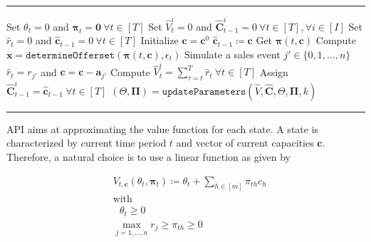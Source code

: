 \begin{minipage}{\linewidth}
	\vspace*{0.5cm}
	\hrule
	\begin{algorithmic}[1]
		\State Set $\theta_t = 0$ and $\boldsymbol{\pi}_t = \boldsymbol{0} ~\forall t \in [T]$ \label{alg-API1}
		 \label{alg-API-Piter1}
		\State Set $\hat{V}_t^i = 0$ and $\boldsymbol{\hat{C}}_{t-1}^i = 0 ~\forall t \in [T], \forall i \in [I] $ \label{alg-API3}
		\label{alg-API-Peval1}
		\State Set $\hat{r}_t = 0$ and $\boldsymbol{\hat{c}}_{t-1} = 0 ~\forall t \in [T]$ \label{alg-API5}
		\State Initialize $\boldsymbol{c} = \boldsymbol{c}^0$\label{alg-API6}
		\State $\boldsymbol{\hat{c}}_{t-1} \coloneqq \boldsymbol{c}$\label{alg-API8}
		\State Get $\boldsymbol{\pi}(t, \boldsymbol{c})$ \label{alg-API-calcPi}
		\State Compute $\boldsymbol{x} = \texttt{determineOfferset}(\boldsymbol{\pi}(t, \boldsymbol{c}), \epsilon_t)$ \label{alg-API10}
		\State Simulate a sales event $j' \in \{0, 1, \dots, n\}$\label{alg-API11}
		\State $\hat{r}_t = r_{j'}$ and $\boldsymbol{c} = \boldsymbol{c} - \boldsymbol{a}_{j'}$\label{alg-API13}
		\EndIf
		\EndFor
		\State Compute $\hat{V}_t^i = \sum_{\tau = t}^{T}\hat{r}_t ~\forall t \in [T]$\label{alg-API14}
		\State Assign $\boldsymbol{\hat{C}}_{t-1}^i = \boldsymbol{\hat{c}}_{t-1} ~\forall t \in [T]$ \label{alg-API15} 
		\EndFor
		\State $\left(\Theta, \boldsymbol{\Pi} \right) = \texttt{updateParameters}(\hat{V}, \boldsymbol{\hat{C}}, \Theta, \boldsymbol{\Pi}, k)$ \label{alg-API-updateParam}
		\EndFor
		\State \Return {$\left(\Theta, \boldsymbol{\Pi} \right)$}
	\end{algorithmic}
	\hrule
	\label{alg-API}
\end{minipage}

API aims at approximating the value function for each state. A state is characterized by current time period $t$ and vector of current capacities $\boldsymbol{c}$. Therefore, a natural choice is to use a linear function as given by

\begin{align}
&V_{t,\boldsymbol{c}}(\theta_t, \boldsymbol{\pi}_t) \coloneqq \theta_t + \sum_{h \in [m]} \pi_{th} c_h\\
&\text{with}\nonumber\\
&~~~\theta_t \geq 0\label{eq-api-theta}\\
&\max_{j=1, \dots, n} r_j \geq \pi_{th} \geq 0\label{eq-api-pi}
\end{align}

